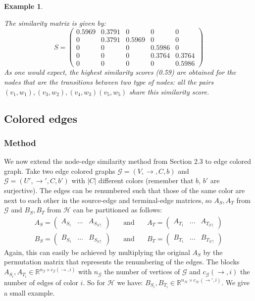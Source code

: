 \documentclass[a4paper,11pt]{report}
\newtheorem{example}[theorem]{Example}
\newcommand{\R}{{\mathbb R}}
\newcommand{\graf}{\mathscr{G}}
\newcommand{\grafeen}{\mathscr{H}}
\newcommand{\hgraf}{\mathcal{G}}
\begin{document}
\begin{example}
\begin{center}
\begin{tikzpicture}[->,>=stealth',shorten >=1pt,auto,node distance=3cm,
                    thick]
\end{tikzpicture}
\end{center}
The similarity matrix is given by:
$$S = \begin{pmatrix}
0.5969&0.3791&0&0&0\\
0&0.3791&0.5969&0&0\\
0&0&0&0.5986&0\\
0&0&0&0.3764&0.3764\\
0&0&0&0&0.5986
\end{pmatrix}$$
As one would expect, the highest similarity scores (0.59) are obtained for the nodes that are the transitions between two type of 
nodes: all the pairs $(v_1, w_1), (v_3, w_2), (v_4, w_3) (v_5, w_5)$ share this similarity 
score.
\end{example}

\subsection{Colored edges}
\subsubsection{Method}
We now extend the node-edge similarity method from Section 2.3 to edge colored 
graph. Take two edge colored graphs $\graf = (V, \to, C, b)$ and $\hgraf = (U', \to', C, b')$ 
with $|C|$ different colors (remember that $b$, $b'$ are surjective). The edges 
can be renumbered such that those of the same color are next to each other in the 
source-edge and terminal-edge matrices, so $A_S, A_T$ from 
$\graf$ and $B_S, B_T$ from $\grafeen$ can be partitioned as follows:
\begin{eqnarray*}
  A_S = \begin{pmatrix}
  A_{S_1} & \ldots & A_{S_{|C|}}
  \end{pmatrix} \quad &\text{and}& \quad A_T = \begin{pmatrix}
  A_{T_1} & \ldots & A_{T_{|C|}}
  \end{pmatrix}\\
   B_S = \begin{pmatrix}
  B_{S_1} & \ldots & B_{S_{|C|}}
  \end{pmatrix} \quad &\text{and}& \quad B_T = \begin{pmatrix}
  B_{T_1} & \ldots & B_{T_{|C|}}
  \end{pmatrix}
\end{eqnarray*}
Again, this can easily be achieved by multiplying the original $A_S$ by the permutation matrix
that represents the renumbering of the edges. The blocks $A_{S_i}, A_{T_i} \in \R^{n_\graf \times c_\graf(\to, i)}$ with $n_\graf$ 
the number of vertices of $\graf$ and $c_\graf(\to,i)$ the number of edges of 
color $i$. So for $\grafeen$ we have: $B_{S_i}, B_{T_i} \in \R^{n_\grafeen \times c_\grafeen(\to', 
i)}$. We give a small example.
\end{document}
